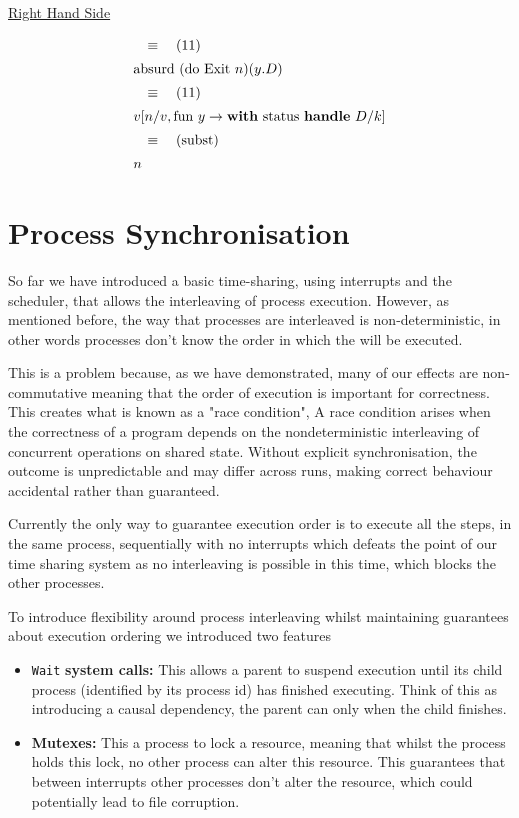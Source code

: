 \documentclass[logo,bsc,singlespacing,parskip]{infthesis}
\begin{document}
\underline{Right Hand Side}

\[
\begin{array}{l}
\quad\equiv\quad (11) \\[5pt]
\text{absurd (do Exit } n) (y. D) \\[5pt]
\quad\equiv\quad (11) \\[5pt]
v [n/v, \text{fun } y \rightarrow \text{\textbf{with} status \textbf{handle} } D/k] \\[5pt]
\quad\equiv\quad (\text{subst}) \\[5pt]
n
\end{array}
\]


\section{Process Synchronisation}
So far we have introduced a basic time-sharing, using interrupts and the scheduler, that allows the interleaving of process execution. However, as mentioned before, the way that processes are interleaved is non-deterministic, in other words processes don't know the order in which the will be executed. 

This is a problem because, as we have demonstrated, many of our effects are non-commutative meaning that the order of execution is important for correctness. This creates what is known as a "race condition", A race condition arises when the correctness of a program depends on the nondeterministic interleaving of concurrent operations on shared state. Without explicit synchronisation, the outcome is unpredictable and may differ across runs, making correct behaviour accidental rather than guaranteed.

Currently the only way to guarantee execution order is to execute all the steps, in the same process, sequentially with no interrupts which defeats the point of our time sharing system as no interleaving is possible in this time, which blocks the other processes.

To introduce flexibility around process interleaving whilst maintaining guarantees about execution ordering we introduced two features
\begin{itemize}
    \item \lstinline{Wait} \textbf{system calls: } This allows a parent to suspend execution until its child process (identified by its process id) has finished executing. Think of this as introducing a causal dependency, the parent can only when the child finishes.
    \item \textbf{Mutexes: } This a process to lock a resource, meaning that whilst the process holds this lock, no other process can alter this resource. This guarantees that between interrupts other processes don't alter the resource, which could potentially lead to file corruption. 
\end{itemize}
\end{document}
